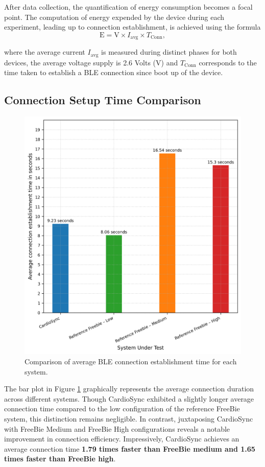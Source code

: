 \noindent After data collection, the quantification of energy consumption becomes a focal point. The computation of energy expended by the device during each experiment, leading up to connection establishment, is achieved using the formula \[\text{E} = \text{V} \times I_\text{avg} \times T_{\text{Conn}},\]

\noindent where the average current $I_\text{avg}$ is measured during distinct phases for both devices, the average voltage supply is 2.6 Volts ($\text{V}$) and $T_\text{Conn}$ corresponds to the time taken to establish a BLE connection since boot up of the device. 
\vspace{1\baselineskip}


\subsection{Connection Setup Time Comparison}
\begin{figure}[t]
    \centering
    \includegraphics[width=0.7\linewidth]{chapters/Results/Connection_time_comparison.png}
    \caption{Comparison of average BLE connection establishment time for each system.}
    \label{fig:conn_time_comp}
\end{figure}


The bar plot in Figure \ref{fig:conn_time_comp} graphically represents the average connection duration across different systems. Though CardioSync exhibited a slightly longer average connection time compared to the low configuration of the reference FreeBie system, this distinction remains negligible. In contrast, juxtaposing CardioSync with FreeBie Medium and FreeBie High configurations reveals a notable improvement in connection efficiency. Impressively, CardioSync achieves an average connection time \textbf{1.79 times faster than FreeBie medium and 1.65 times faster than FreeBie high}.
\vspace{1\baselineskip}

